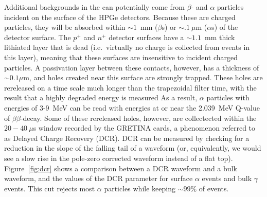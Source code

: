 \documentclass[/main.tex]{subfiles}
\begin{document}
Additional backgrounds in the \MJD can potentially come from $\beta$- and $\alpha$ particles incident on the surface of the HPGe detectors.
Because these are charged particles, they will be absorbed within ${\sim}1$~mm ($\beta$s) or ${\sim}.1~\mu$m ($\alpha$s) of the detector surface.
The $p^+$ and $n^+$ detector surfaces have a ${\sim}1.1$~mm thick lithiated layer that is dead (i.e.~virtually no charge is collected from events in this layer), meaning that these surfaces are insensitive to incident charged particles.
A passivation layer between these contacts, however, has a thickness of ${\sim}0.1 \mu$m, and holes created near this surface are strongly trapped.
These holes are rereleased on a time scale much longer than the trapezoidal filter time, with the result that a highly degraded energy is measured
As a result, $\alpha$ particles with energies of 3-9~MeV can be read with energies at or near the 2.039~MeV Q-value of $\beta\beta$-decay.
Some of these rereleased holes, however, are collectected within the $20-40~\mu$s window recorded by the GRETINA cards, a phenomenon referred to as Delayed Charge Recovery (DCR).
DCR can be measured by checking for a reduction in the slope of the falling tail of a waveform (or, equivalently, we would see a slow rise in the pole-zero corrected waveform instead of a flat top).
Figure~\ref{fig:dcr} shows a comparison between a DCR waveform and a bulk waveform, and the values of the DCR parameter for surface $\alpha$ events and bulk $\gamma$ events.
This cut rejects most $\alpha$ particles while keeping ${\sim}99\%$ of \znbb events.
\end{document}
